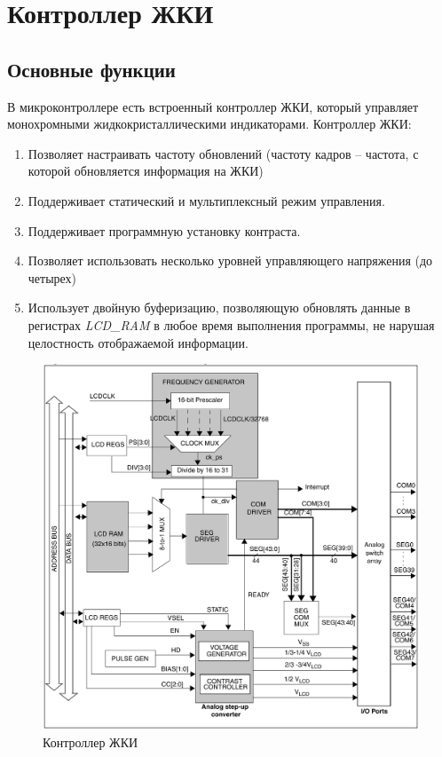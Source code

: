 \section{Контроллер ЖКИ}
\subsection{Основные функции}
В микроконтроллере есть встроенный контроллер ЖКИ, который управляет монохромными жидкокристаллическими индикаторами. Контроллер ЖКИ:
\begin{enumerate}
\item Позволяет настраивать частоту обновлений (частоту кадров -- частота, с которой обновляется информация на ЖКИ)
\item Поддерживает статический и мультиплексный режим управления.
\item Поддерживает программную установку контраста.
\item Позволяет использовать несколько уровней управляющего напряжения (до четырех)
\item Использует двойную буферизацию, позволяющую обновлять данные в регистрах \textit{LCD\_RAM} в любое время выполнения программы, не нарушая целостность отображаемой информации.
\end{enumerate}

\begin{figure}[h!]
\begin{center}
\includegraphics[scale=0.25]{Image/24.jpg}
\end{center}
\caption{Контроллер ЖКИ}
\end{figure}

